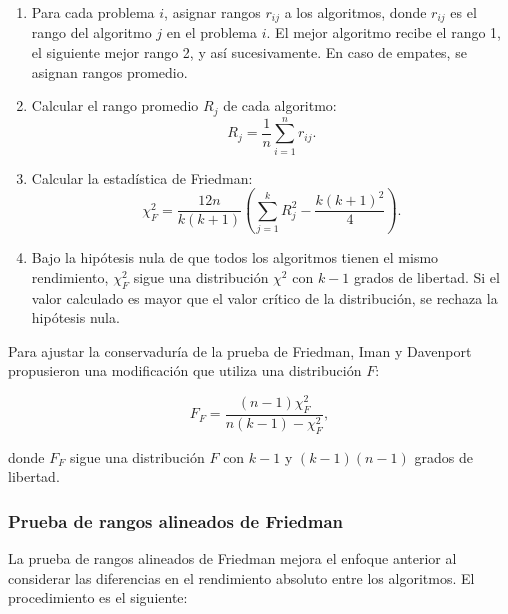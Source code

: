 \begin{enumerate}
    \item Para cada problema $i$, asignar rangos $r_{ij}$ a los algoritmos, donde $r_{ij}$ es el rango del algoritmo $j$ en el problema $i$. El mejor algoritmo recibe el rango 1, el siguiente mejor rango 2, y así sucesivamente. En caso de empates, se asignan rangos promedio.

    \item Calcular el rango promedio $R_j$ de cada algoritmo:
    \[
    R_j = \frac{1}{n} \sum_{i=1}^{n} r_{ij}.
    \]

    \item Calcular la estadística de Friedman:
    \[
    \chi^2_F = \frac{12n}{k(k+1)} \left( \sum_{j=1}^{k} R_j^2 - \frac{k(k+1)^2}{4} \right).
    \]

    \item Bajo la hipótesis nula de que todos los algoritmos tienen el mismo rendimiento, $\chi^2_F$ sigue una distribución $\chi^2$ con $k-1$ grados de libertad. Si el valor calculado es mayor que el valor crítico de la distribución, se rechaza la hipótesis nula.
\end{enumerate}

Para ajustar la conservaduría de la prueba de Friedman, Iman y Davenport propusieron una modificación que utiliza una distribución $F$:

\[
F_F = \frac{(n-1) \chi^2_F}{n(k-1) - \chi^2_F},
\]

donde $F_F$ sigue una distribución $F$ con $k-1$ y $(k-1)(n-1)$ grados de libertad.

\subsubsection{Prueba de rangos alineados de Friedman}

La prueba de rangos alineados de Friedman mejora el enfoque anterior al considerar las diferencias en el rendimiento absoluto entre los algoritmos. El procedimiento es el siguiente:

